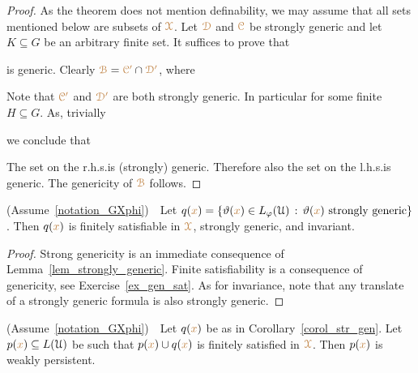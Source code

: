 \begin{proof}
  As the theorem does not mention definability, we may assume that all sets mentioned below are subsets of ${\color{brown}\EuScript X}$.
  Let ${\color{brown}\EuScript D}$ and ${\color{brown}\EuScript C}$ be strongly generic and let $K\subseteq G$ be an arbitrary finite set.
  It suffices to prove that 
  

  is generic. 
  Clearly ${\color{brown}\EuScript B}={\color{brown}\EuScript C'}\cap{\color{brown}\EuScript D'}$, where
  

  Note that ${\color{brown}\EuScript C'}$ and ${\color{brown}\EuScript D'}$ are both strongly generic.
  In particular  for some finite $H\subseteq G$.
  As, trivially


  we conclude that
  

  The set on the r.h.s.\@ is (strongly) generic.
  Therefore also the set on the l.h.s.\@ is generic.
  The genericity of ${\color{brown}\EuScript B}$ follows.
\end{proof}

\begin{corollary}\label{corol_str_gen}
  (Assume~\ref{notation_GXphi})\ \  
  Let $q({\color{brown} x})=\{\vartheta({\color{brown} x})\in L_\varphi(\EuScript U)\,:\, \vartheta({\color{brown} x})\textrm{ strongly generic}\}$.
  Then $q({\color{brown} x})$ is finitely satisfiable in ${\color{brown}\EuScript X}$, strongly generic, and invariant.
\end{corollary}

\begin{proof}
  Strong genericity is an immediate consequence of Lemma~\ref{lem_strongly_generic}.
  Finite satisfiability is a consequence of genericity, see Exercise~\ref{ex_gen_sat}.
  As for invariance, note that any translate of a strongly generic formula is also strongly generic.
\end{proof}

\begin{corollary}\label{corol_q_w_pers}
  (Assume~\ref{notation_GXphi})\ \  
  Let $q({\color{brown} x})$ be as in Corollary~\ref{corol_str_gen}.
  Let $p({\color{brown} x})\subseteq L(\EuScript U)$ be such that $p({\color{brown} x})\cup q({\color{brown} x})$ is finitely satisfied in ${\color{brown}\EuScript X}$.
  Then $p({\color{brown} x})$ is weakly persistent.
\end{corollary}

